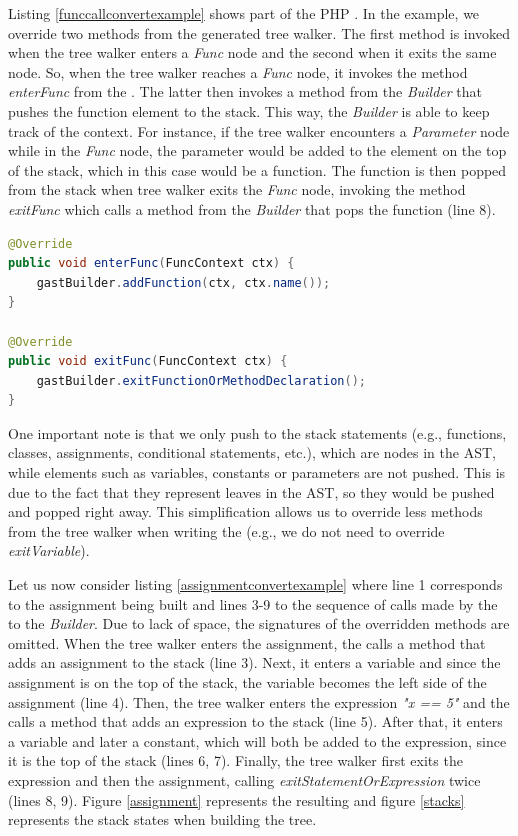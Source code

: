 Listing \ref{funccallconvertexample} shows part of the PHP \converter{}. In the example, we override two methods from the generated tree walker. The first method is invoked when the tree walker enters a \textit{Func} node and the second when it exits the same node. So, when the tree walker reaches a \textit{Func} node, it invokes the method \textit{enterFunc} from the \converter{}. The latter then invokes a method from the \textit{\astname{} Builder} that pushes the function element to the stack. This way, the \textit{\astname{} Builder} is able to keep track of the context. For instance, if the tree walker encounters a \textit{Parameter} node while in the \textit{Func} node, the parameter would be added to the element on the top of the stack, which in this case would be a function. The function is then popped from the stack when tree walker exits the \textit{Func} node, invoking the method \textit{exitFunc} which calls a method from the \textit{\astname{} Builder} that pops the function (line 8). 

\begin{lstlisting}[language=Java,
    showstringspaces=false,
    caption={Function declaration example},
    label=funccallconvertexample, float]
@Override
public void enterFunc(FuncContext ctx) {
    gastBuilder.addFunction(ctx, ctx.name());
}

@Override
public void exitFunc(FuncContext ctx) {
    gastBuilder.exitFunctionOrMethodDeclaration();
}
\end{lstlisting} 

One important note is that we only push to the stack statements (e.g., functions, classes, assignments, conditional statements, etc.), which are nodes in the AST, while elements such as variables, constants or parameters are not pushed. This is due to the fact that they represent leaves in the AST, so they would be pushed and popped right away. This simplification allows us to override less methods from the tree walker when writing the \converter{} (e.g., we do not need to override \textit{exitVariable}).


Let us now consider listing \ref{assignmentconvertexample} where line 1 corresponds to the assignment being built and lines 3-9 to the sequence of calls made by the \converter{} to the \textit{\astname{} Builder}. Due to lack of space, the signatures of the overridden methods are omitted. When the tree walker enters the assignment, the \converter{} calls a method that adds an assignment to the stack (line 3). Next, it enters a variable and since the assignment is on the top of the stack, the variable becomes the left side of the assignment (line 4). Then, the tree walker enters the expression \textit{"x == 5"} and the \converter{} calls a method that adds an expression to the stack (line 5). After that, it enters a variable and later a constant, which will both be added to the expression, since it is the top of the stack (lines 6, 7). Finally, the tree walker first exits the expression and then the assignment, calling \textit{exitStatementOrExpression} twice (lines 8, 9). Figure \ref{assignment} represents the resulting \astname{} and figure \ref{stacks} represents the stack states when building the tree.

